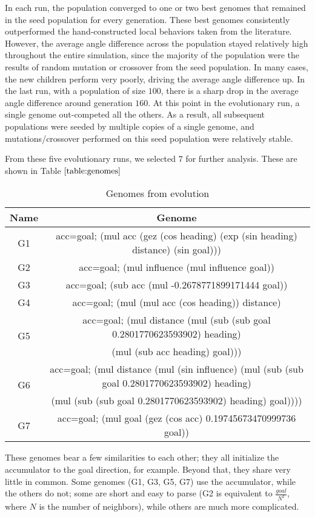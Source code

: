 In each run, the population converged to one or two best genomes that remained
in the seed population for every generation.
These best genomes consistently outperformed the hand-constructed local behaviors
taken from the literature.
However, the average angle difference across the population stayed relatively
high throughout the entire simulation, since the majority of the population
were the results of random mutation or crossover from the seed population.
In many cases, the new children perform very poorly, driving the average angle
difference up.
In the last run, with a population of size $100$, there is a sharp drop in the
average angle difference around generation $160$.
At this point in the evolutionary run, a single genome out-competed all the
others.
As a result, all subsequent populations were seeded by multiple copies of a
single genome, and mutations/crossover performed on this seed population
were relatively stable.

From these five evolutionary runs, we selected $7$ for further analysis.
These are shown in Table $\ref{table:genomes}$
\begin{table}[h]
\centering
\begin{tabular}{|c|c|}
    \hline
    \textbf{Name} & \textbf{Genome} \\
    \hline
    G1 & acc=goal; (mul acc (gez (cos heading) (exp (sin heading) distance) (sin goal))) \\ \hline
    G2 & acc=goal; (mul influence (mul influence goal)) \\ \hline
    G3 & acc=goal; (sub acc (mul -0.2678771899171444 goal)) \\ \hline
    G4 & acc=goal; (mul (mul acc (cos heading)) distance) \\ \hline
    \multirow{2}{*}{G5} & acc=goal; (mul distance (mul (sub (sub goal 0.2801770623593902) heading) \\
    & (mul (sub acc heading) goal))) \\ \hline
    \multirow{2}{*}{G6} & acc=goal; (mul distance (mul (sin influence) (mul (sub (sub goal 0.2801770623593902) heading) \\
    & (mul (sub (sub goal 0.2801770623593902) heading) goal)))) \\ \hline
    G7 & acc=goal; (mul goal (gez (cos acc) 0.19745673470999736 goal)) \\ \hline
\end{tabular}
\caption{Genomes from evolution}
\label{table:genomes}
\end{table}
These genomes bear a few similarities to each other; they all initialize the
accumulator to the goal direction, for example.
Beyond that, they share very little in common.
Some genomes (G1, G3, G5, G7) use the accumulator, while the others do not; some
are short and easy to parse (G2 is equivalent to $\frac{goal}{N^2}$, where
$N$ is the number of neighbors), while others are much more complicated.

